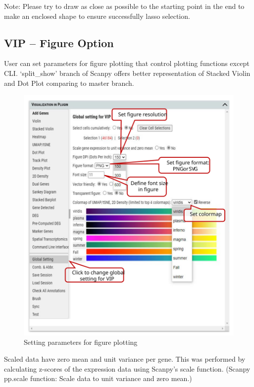 \documentclass[
]{article}
\begin{document}
Note: Please try to draw as close as possible to the starting point in the end to make an enclosed shape to ensure successfully lasso selection.

\hypertarget{vip-figure-option}{%
\subsection{VIP -- Figure Option}\label{vip-figure-option}}

User can set parameters for figure plotting that control plotting functions except CLI. `split\_show' branch of Scanpy offers better representation of Stacked Violin and Dot Plot comparing to master branch.

\begin{figure}
\centering
\includegraphics{figures/F5_label.svg}
\caption{Setting parameters for figure plotting}
\end{figure}

Scaled data have zero mean and unit variance per gene. This was performed by calculating z-scores of the expression data using Scanpy's scale function. (Scanpy pp.scale function: Scale data to unit variance and zero mean.)
\end{document}
